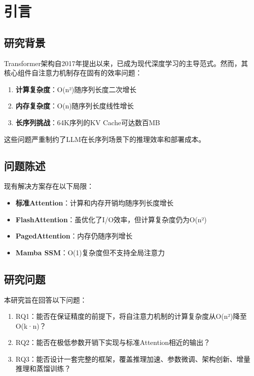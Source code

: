 \documentclass[12pt, a4paper]{article}
\begin{document}
\newpage

\section{引言}

\subsection{研究背景}

Transformer架构自2017年提出以来\cite{vaswani2017attention}，已成为现代深度学习的主导范式。然而，其核心组件自注意力机制存在固有的效率问题：

\begin{enumerate}
    \item \textbf{计算复杂度}：O(n²)随序列长度二次增长
    \item \textbf{内存复杂度}：O(n)随序列长度线性增长
    \item \textbf{长序列挑战}：64K序列的KV Cache可达数百MB
\end{enumerate}

这些问题严重制约了LLM在长序列场景下的推理效率和部署成本。

\subsection{问题陈述}

现有解决方案存在以下局限：

\begin{itemize}
    \item \textbf{标准Attention}：计算和内存开销均随序列长度增长
    \item \textbf{FlashAttention\cite{dao2022flashattention}}：虽优化了I/O效率，但计算复杂度仍为O(n²)
    \item \textbf{PagedAttention}：内存仍随序列增长
    \item \textbf{Mamba SSM\cite{gu2023mamba}}：O(1)复杂度但不支持全局注意力
\end{itemize}

\subsection{研究问题}

本研究旨在回答以下问题：

\begin{enumerate}
    \item RQ1：能否在保证精度的前提下，将自注意力机制的计算复杂度从O(n²)降至O(k·n)？
    \item RQ2：能否在极低参数开销下实现与标准Attention相近的输出？
    \item RQ3：能否设计一套完整的框架，覆盖推理加速、参数微调、架构创新、增量推理和蒸馏训练？
\end{enumerate}
\end{document}

